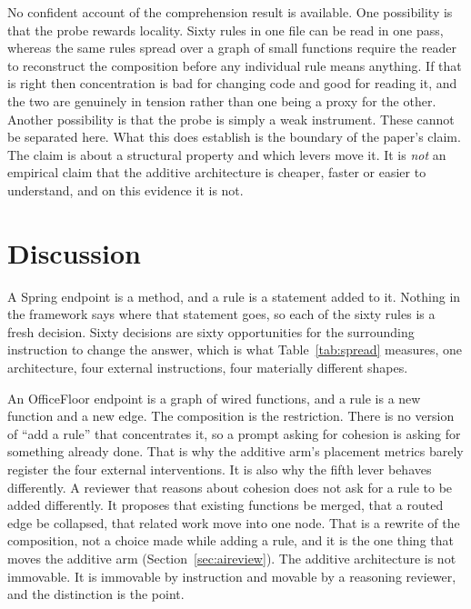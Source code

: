 \documentclass[11pt,a4paper]{article}
\begin{document}
No confident account of the comprehension result is available. One possibility is
that the probe rewards locality. Sixty rules in one file can be read in one pass,
whereas the same rules spread over a graph of small functions require the reader
to reconstruct the composition before any individual rule means anything. If that
is right then concentration is bad for changing code and good for reading it, and
the two are genuinely in tension rather than one being a proxy for the other.
Another possibility is that the probe is simply a weak instrument. These cannot be
separated here. What this does establish is the boundary of the paper's claim. The
claim is about a structural property and which levers move it. It is \emph{not} an
empirical claim that the additive architecture is cheaper, faster or easier to
understand, and on this evidence it is not.

\section{Discussion}
\label{sec:disc}

A Spring endpoint is a method, and a rule is a statement added to it. Nothing
in the framework says where that statement goes, so each of the sixty rules is
a fresh decision. Sixty decisions are sixty opportunities for the surrounding
instruction to change the answer, which is what Table~\ref{tab:spread}
measures, one architecture, four external instructions, four materially
different shapes.

An OfficeFloor endpoint is a graph of wired functions, and a rule is a new
function and a new edge. The composition is the restriction. There is no
version of ``add a rule'' that concentrates it, so a prompt asking for cohesion
is asking for something already done. That is why the additive arm's placement
metrics barely register the four external interventions. It is also why the fifth
lever behaves differently. A reviewer that reasons about cohesion does not ask
for a rule to be added differently. It proposes that existing functions be merged,
that a routed edge be collapsed, that related work move into one node. That is a
rewrite of the composition, not a choice made while adding a rule, and it is the
one thing that moves the additive arm (Section~\ref{sec:aireview}). The additive
architecture is not immovable. It is immovable by instruction and movable by a
reasoning reviewer, and the distinction is the point.
\end{document}
